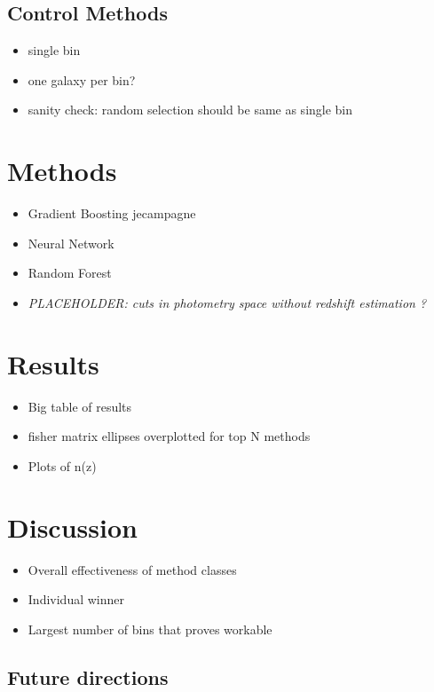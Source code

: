 \documentclass[twocolumn,twocolappendix]{aastex63}
\newcommand{\placeholder}[1]{\textit{PLACEHOLDER: #1}}
\begin{document}
\subsection{Control Methods}
\begin{itemize}
    \item single bin
    \item one galaxy per bin?
    \item sanity check: random selection should be same as single bin
\end{itemize}


\section{Methods}
\begin{itemize}
    \item Gradient Boosting \@ jecampagne
    \item Neural Network \@EiffL
    \item Random Forest
    \item \placeholder{cuts in photometry space without redshift estimation \@barber?}
\end{itemize}

\section{Results}
\begin{itemize}
    \item Big table of results
    \item fisher matrix ellipses overplotted for top N methods
    \item Plots of n(z)
\end{itemize}

\section{Discussion}
\begin{itemize}
    \item Overall effectiveness of method classes
    \item Individual winner
    \item Largest number of bins that proves workable
\end{itemize}

\subsection{Future directions}
\end{document}
